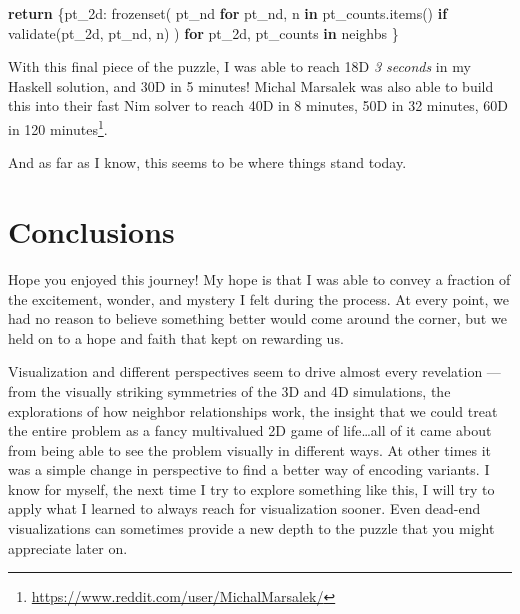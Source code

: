 \documentclass[]{article}
\newenvironment{Shaded}{}{}
\newcommand{\BuiltInTok}[1]{#1}
\newcommand{\ControlFlowTok}[1]{\textcolor[rgb]{0.00,0.44,0.13}{\textbf{#1}}}
\newcommand{\KeywordTok}[1]{\textcolor[rgb]{0.00,0.44,0.13}{\textbf{#1}}}
\newcommand{\NormalTok}[1]{#1}
\renewcommand{\href}[2]{#2\footnote{\url{#1}}}
\begin{document}
\begin{Shaded}
\begin{Highlighting}[]
    \ControlFlowTok{return}\NormalTok{ \{pt\_2d: }\BuiltInTok{frozenset}\NormalTok{(}
\NormalTok{                       pt\_nd }\ControlFlowTok{for}\NormalTok{ pt\_nd, n }\KeywordTok{in}\NormalTok{ pt\_counts.items()}
                             \ControlFlowTok{if}\NormalTok{ validate(pt\_2d, pt\_nd, n)}
\NormalTok{                   )}
              \ControlFlowTok{for}\NormalTok{ pt\_2d, pt\_counts }\KeywordTok{in}\NormalTok{ neighbs}
\NormalTok{           \}}
\end{Highlighting}
\end{Shaded}

With this final piece of the puzzle, I was able to reach 18D \emph{3 seconds} in
my Haskell solution, and 30D in 5 minutes! Michal Marsalek was also able to
build this into their fast Nim solver to
\href{https://www.reddit.com/user/MichalMarsalek/}{reach 40D in 8 minutes, 50D
in 32 minutes, 60D in 120 minutes}.

And as far as I know, this seems to be where things stand today.

\hypertarget{conclusions}{%
\section{Conclusions}\label{conclusions}}

Hope you enjoyed this journey! My hope is that I was able to convey a fraction
of the excitement, wonder, and mystery I felt during the process. At every
point, we had no reason to believe something better would come around the
corner, but we held on to a hope and faith that kept on rewarding us.

Visualization and different perspectives seem to drive almost every revelation
--- from the visually striking symmetries of the 3D and 4D simulations, the
explorations of how neighbor relationships work, the insight that we could treat
the entire problem as a fancy multivalued 2D game of life\ldots all of it came
about from being able to see the problem visually in different ways. At other
times it was a simple change in perspective to find a better way of encoding
variants. I know for myself, the next time I try to explore something like this,
I will try to apply what I learned to always reach for visualization sooner.
Even dead-end visualizations can sometimes provide a new depth to the puzzle
that you might appreciate later on.
\end{document}
